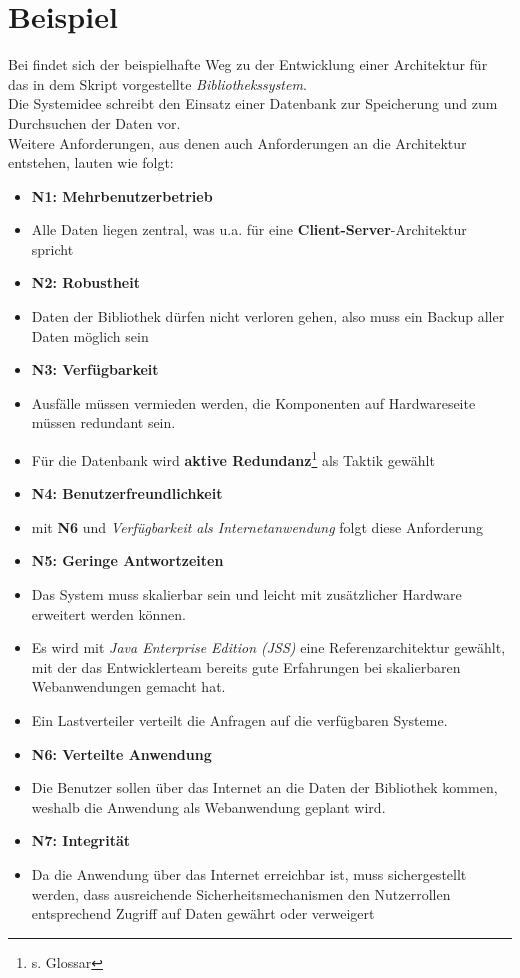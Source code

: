 \section{Beispiel}

Bei \cite[43 ff.]{Wed09b} findet sich der beispielhafte Weg zu der Entwicklung einer Architektur für das in dem Skript vorgestellte \textit{Bibliothekssystem}.\\

\noindent
Die Systemidee schreibt den Einsatz einer Datenbank zur Speicherung und zum Durchsuchen der Daten vor.\\
Weitere Anforderungen, aus denen auch Anforderungen an die Architektur entstehen, lauten wie folgt:

\begin{itemize}
    \item \textbf{N1: Mehrbenutzerbetrieb}
    \item[] Alle Daten liegen zentral, was u.a. für eine \textbf{Client-Server}-Architektur spricht
    \item \textbf{N2: Robustheit}
    \item[] Daten der Bibliothek dürfen nicht verloren gehen, also muss ein Backup aller Daten möglich sein
    \item \textbf{N3: Verfügbarkeit}
    \item[] Ausfälle müssen vermieden werden, die Komponenten auf Hardwareseite müssen redundant sein.
    \item[] Für die Datenbank wird \textbf{aktive Redundanz}\footnote{s. Glossar} als Taktik gewählt
    \item \textbf{N4: Benutzerfreundlichkeit}
    \item[] mit \textbf{N6} und \textit{Verfügbarkeit als Internetanwendung} folgt diese Anforderung
    \item \textbf{N5: Geringe Antwortzeiten}
    \item[] Das System muss skalierbar sein und leicht mit zusätzlicher Hardware erweitert werden können.
    \item[] Es wird mit \textit{Java Enterprise Edition (JSS)} eine Referenzarchitektur gewählt, mit der das Entwicklerteam bereits gute Erfahrungen bei skalierbaren Webanwendungen gemacht hat.
    \item[] Ein Lastverteiler verteilt die Anfragen auf die verfügbaren Systeme.
    \item \textbf{N6: Verteilte Anwendung}
    \item[] Die Benutzer sollen über das Internet an die Daten der Bibliothek kommen, weshalb die Anwendung als Webanwendung geplant wird.
    \item \textbf{N7: Integrität}
    \item[] Da die Anwendung über das Internet erreichbar ist, muss sichergestellt werden, dass ausreichende Sicherheitsmechanismen den Nutzerrollen entsprechend Zugriff auf Daten gewährt oder verweigert
\end{itemize}